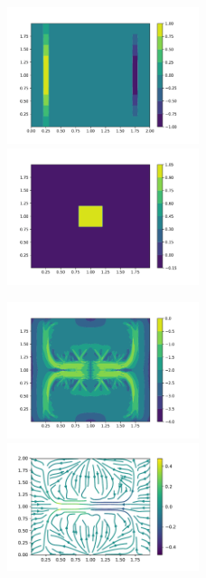 \documentclass{article}
\theoremstyle{plain}
\theoremstyle{remark}
\theoremstyle{remark}
\theoremstyle{remark}
\numberwithin{equation}{section}
\begin{document}
\begin{figure}
  \includegraphics[width=0.5\textwidth]{4/m1}
  \includegraphics[width=0.5\textwidth]{4/s}
\end{figure}
\begin{figure}
  \includegraphics[width=0.5\textwidth]{4/PCG}
  \includegraphics[width=0.5\textwidth]{4/vector}
\end{figure}
\end{document}

